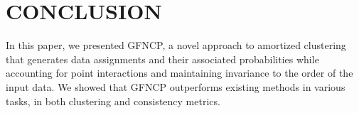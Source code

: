 
\section{CONCLUSION}\label{sec:conclusion}
In this paper, we presented GFNCP, a novel approach to amortized clustering that generates data assignments and their associated probabilities while accounting for point interactions and maintaining invariance to the order of the input data.
%
We showed that GFNCP outperforms existing methods in various tasks, in both clustering and consistency metrics.

